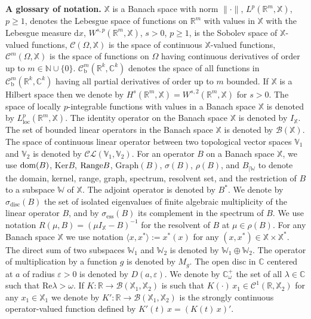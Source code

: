 \documentclass[11pt]{amsart}
\numberwithin{equation}{section}
\def\eps{\varepsilon }
\newcommand\R{\mathbb R}
\newcommand\C{\mathbb C}
\def\eps{\varepsilon}
\newcommand{\RR}{{\mathbb R}}
\newcommand{\NN}{{\mathbb N}}
\newcommand{\CC}{{\mathbb C}}
\newcommand{\rmd}{{\mathrm{d}}}
\newcommand{\Ker}{{\mathrm{Ker}}}
\newcommand{\rmb}{{\mathrm{b}}}
\newcommand{\Range}{{\rm Range }}
\theoremstyle{remark}
\theoremstyle{definition}
\newcommand\cB{{\mathcal B}}
\newcommand\cC{{\mathcal C}}
\newcommand\cL{{\mathcal L}}
\newcommand\bV{{\mathbb V}}
\newcommand\bW{{\mathbb W}}
\newcommand\bX{{\mathbb X}}
\newcommand{\dom}{\text{\rm{dom}}}
\begin{document}
\noindent\textbf{A glossary of notation.}
$\bX$ is a Banach space with norm $\|\cdot\|$, $L^p(\RR^m,\bX)$, $p\geq 1$, denotes the Lebesgue space of functions on $\RR^m$ with values in $\bX$ with the Lebesgue measure $\rmd x$, 
$W^{s,p}(\RR^m,\bX)$, $s> 0$, $p\geq 1$, is the Sobolev space of $\bX$-valued functions, $\mathcal{C}(\Omega,\bX)$ is the space of continuous $\bX$-valued functions, $\mathcal{C}^m(\Omega,\bX)$ is the space of functions on $\Omega$ having continuous derivatives of order up to $m\in\NN\cup\{0\}$. $\cC^m_\rmb(\R^k,\C^k)$ denotes the space of all functions  in $\cC^m_\rmb(\R^k,\C^k)$ having all partial derivatives of order up to $m$ bounded. If $\bX$ is a Hilbert space then we denote by $H^s(\RR^m,\bX)=W^{s,2}(\RR^m,\bX)$ for $s>0$. The space of locally $p$-integrable functions with values in a Banach space $\bX$ is denoted by $L^p_{\mathrm{loc}}(\RR^m,\bX)$. 
The identity operator on the Banach space $\bX$ is denoted by $I_\bX$. The set of bounded linear operators in the Banach space $\bX$ is denoted by $\cB(\bX)$. The space of continuous linear operator between two topological vector spaces $\bV_1$ and $\bV_2$ is denoted by $\cC\cL(\bV_1,\bV_2)$. For an operator $B$ on a Banach space $\bX$, we use  $\dom(B)$, $\Ker B$, $\Range B$, $\mathrm{Graph}(B)$, $\sigma(B)$, $\rho(B)$, and $B_{|\bW}$ to denote the domain, kernel, range, graph, spectrum, resolvent set, and the restriction of $B$ to a subspace $\bW$ of $\bX$. The adjoint operator is denoted by $B^*$. We denote by $\sigma_{\mathrm{disc}}(B)$ the set of isolated eigenvalues of finite algebraic multiplicity of the linear operator $B$, and by $\sigma_{\mathrm{ess}}(B)$ its complement in the spectrum of $B$. We use notation $R(\mu,B)=(\mu I_\bX-B)^{-1}$ for the resolvent of $B$ at $\mu\in\rho(B)$. For any Banach space $\bX$ we use notation $\langle x,x^*\rangle:=x^*(x)$ for any $(x,x^*)\in\bX\times\bX^*$.  The direct sum of two subspaces $\bW_1$ and $\bW_2$ is denoted by $\bW_1\oplus \bW_2$. The operator of multiplication by a function $g$ is denoted by $M_g$.  The open disc in $\CC$ centered at $a$ of radius $\eps>0$ is denoted by $D(a,\eps)$. We denote by $\CC_\omega^+$ the set of all $\lambda\in\CC$ such that $\mathrm{Re}\lambda>\omega$. 
If $K: \mathbb{R} \to \mathcal{B}(\bX_1, \bX_2)$ is such that $K(\cdot)\,x_1 \in \mathcal{C}^1(\mathbb{R}, \bX_2)$ for any $x_1 \in \bX_1$ we denote by $K': \mathbb{R} \to \mathcal{B}(\bX_1, \bX_2)$ is the strongly continuous operator-valued function defined by $K'(t)\,x = (K(t)\,x)'$. 	
	
\end{document}
